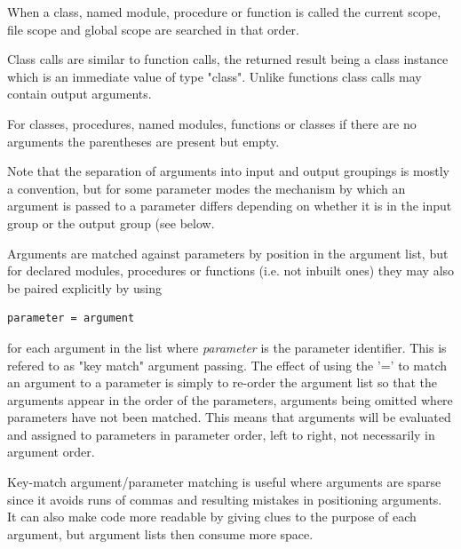             When a class, named module, procedure or function is called
            the current scope, file scope and global scope are searched
            in that order.
            
            Class calls are similar to function calls, the returned result being
            a class instance which is an immediate value of type "class".
            Unlike functions class calls may contain output arguments.
        
            For classes, procedures, named modules, functions or classes if
            there are no arguments the parentheses are present but empty.
            
            Note that the separation of arguments into input and output
            groupings is mostly a convention, but for some parameter
            modes the mechanism by which an argument is passed to a parameter
            differs depending on whether it is in the input group or the output
            group (see  below.

            Arguments are matched against parameters by position in the
            argument list, but for declared modules, procedures or
            functions (i.e. not inbuilt ones) they may also be paired
            explicitly by using
            \begin{lstlisting}[gobble=12, language=threepl]
               parameter = argument
            \end{lstlisting}
            for each argument in the list where {\em parameter} is the parameter
            identifier. This is refered to as "key match" argument passing. The
            effect of using the '=' to match an argument to a parameter is simply
            to re-order the argument list so that the arguments appear in the order
            of the parameters, arguments being omitted where parameters have not
            been matched. This means that arguments will be evaluated and assigned
            to parameters in parameter order, left to right, not necessarily in
            argument order.
            
            Key-match argument/parameter matching is useful where arguments are
            sparse since it avoids runs of commas and resulting mistakes in
            positioning arguments. It can also make code more readable by giving
            clues to the purpose of each argument, but argument lists then
            consume more space.
                
